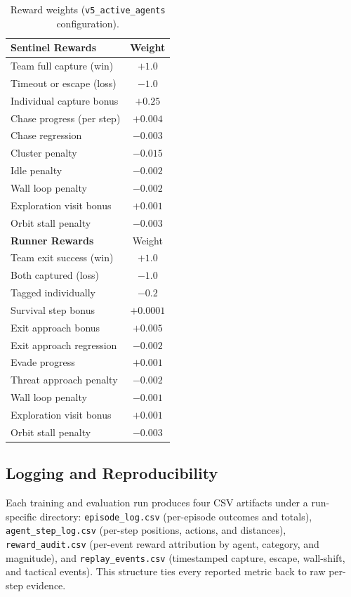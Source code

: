 \documentclass[journal]{IEEEtran}
\begin{document}
\begin{table}[t]
\centering
\caption{Reward weights (\texttt{v5\_active\_agents} configuration).}
\label{tab:rewards}
\begin{tabular}{lc}
\toprule
\textbf{Sentinel Rewards} & Weight \\
\midrule
Team full capture (win) & $+1.0$ \\
Timeout or escape (loss) & $-1.0$ \\
Individual capture bonus & $+0.25$ \\
Chase progress (per step) & $+0.004$ \\
Chase regression & $-0.003$ \\
Cluster penalty & $-0.015$ \\
Idle penalty & $-0.002$ \\
Wall loop penalty & $-0.002$ \\
Exploration visit bonus & $+0.001$ \\
Orbit stall penalty & $-0.003$ \\
\midrule
\textbf{Runner Rewards} & Weight \\
\midrule
Team exit success (win) & $+1.0$ \\
Both captured (loss) & $-1.0$ \\
Tagged individually & $-0.2$ \\
Survival step bonus & $+0.0001$ \\
Exit approach bonus & $+0.005$ \\
Exit approach regression & $-0.002$ \\
Evade progress & $+0.001$ \\
Threat approach penalty & $-0.002$ \\
Wall loop penalty & $-0.001$ \\
Exploration visit bonus & $+0.001$ \\
Orbit stall penalty & $-0.003$ \\
\bottomrule
\end{tabular}
\end{table}

\subsection{Logging and Reproducibility}

Each training and evaluation run produces four CSV artifacts under a run-specific directory: \texttt{episode\_log.csv} (per-episode outcomes and totals), \texttt{agent\_step\_log.csv} (per-step positions, actions, and distances), \texttt{reward\_audit.csv} (per-event reward attribution by agent, category, and magnitude), and \texttt{replay\_events.csv} (timestamped capture, escape, wall-shift, and tactical events). This structure ties every reported metric back to raw per-step evidence.
\end{document}
